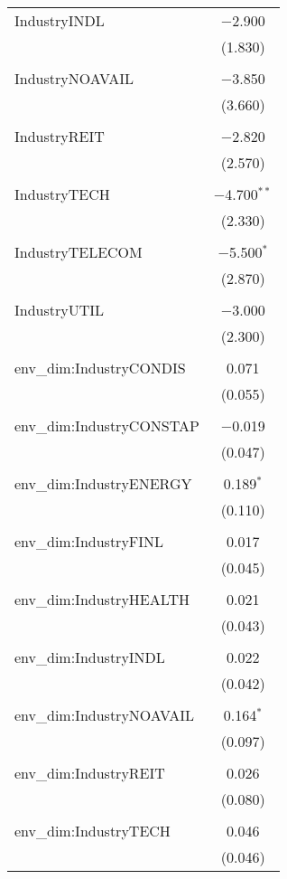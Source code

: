 \begin{table}[!htbp]
\begin{tabular}{@{\extracolsep{5pt}}lc}
 IndustryINDL & $-$2.900 \\ 
  & (1.830) \\ 
  & \\ 
 IndustryNOAVAIL & $-$3.850 \\ 
  & (3.660) \\ 
  & \\ 
 IndustryREIT & $-$2.820 \\ 
  & (2.570) \\ 
  & \\ 
 IndustryTECH & $-$4.700$^{**}$ \\ 
  & (2.330) \\ 
  & \\ 
 IndustryTELECOM & $-$5.500$^{*}$ \\ 
  & (2.870) \\ 
  & \\ 
 IndustryUTIL & $-$3.000 \\ 
  & (2.300) \\ 
  & \\ 
 env\_dim:IndustryCONDIS & 0.071 \\ 
  & (0.055) \\ 
  & \\ 
 env\_dim:IndustryCONSTAP & $-$0.019 \\ 
  & (0.047) \\ 
  & \\ 
 env\_dim:IndustryENERGY & 0.189$^{*}$ \\ 
  & (0.110) \\ 
  & \\ 
 env\_dim:IndustryFINL & 0.017 \\ 
  & (0.045) \\ 
  & \\ 
 env\_dim:IndustryHEALTH & 0.021 \\ 
  & (0.043) \\ 
  & \\ 
 env\_dim:IndustryINDL & 0.022 \\ 
  & (0.042) \\ 
  & \\ 
 env\_dim:IndustryNOAVAIL & 0.164$^{*}$ \\ 
  & (0.097) \\ 
  & \\ 
 env\_dim:IndustryREIT & 0.026 \\ 
  & (0.080) \\ 
  & \\ 
 env\_dim:IndustryTECH & 0.046 \\ 
  & (0.046) \\ 

\end{tabular}
\end{table}
